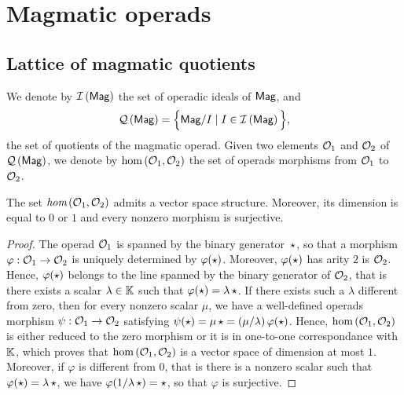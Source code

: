 
\section{Magmatic operads}


\subsection{Lattice of magmatic quotients}

We denote by $\mathcal{I}\left(\mathsf{Mag}\right)$ the set of operadic ideals of $\mathsf{Mag}$, and
\begin{equation} \label{equ:definition_of_QMag}
  \mathcal{Q}\left(\mathsf{Mag}\right) =\Big\{\mathsf{Mag}/ I\mid I\in\mathcal{I}\left(\mathsf{Mag}\right)\Big\},
  \end{equation}
the set of quotients of the magmatic operad. Given two elements $\mathcal{O}_1$
and $\mathcal{O}_2$ of $\mathcal{Q}\left(\mathsf{Mag}\right)$, we denote by $\text{hom}\left(\mathcal{O}_1,\mathcal{O}_2\right)$
the set of operads morphisms from $\mathcal{O}_1$ to $\mathcal{O}_2$.

\begin{Proposition} \label{prop:endomorphisms_of_magmatic_operads}
  The set $\emph{hom}\left(\mathcal{O}_1,\mathcal{O}_2\right)$ admits a vector space
  structure. Moreover, its dimension is equal to $0$ or $1$ and every
  nonzero morphism is surjective.
\end{Proposition}

\begin{proof}
  The operad $\mathcal{O}_1$ is spanned by the binary generator~$\operatorname{\star}$, so
  that a morphism $\varphi:\mathcal{O}_1\to\mathcal{O}_2$ is uniquely determined by
  $\varphi(\operatorname{\star})$. Moreover, $\varphi(\operatorname{\star})$ has arity $2$ is
  $\mathcal{O}_2$. Hence, $\varphi(\operatorname{\star})$ belongs to the line spanned by
  the binary generator of $\mathcal{O}_2$, that is there exists a scalar
  $\lambda\in\mathbb{K}$ such that $\varphi(\operatorname{\star})=\lambda\operatorname{\star}$. If there
  exists such a $\lambda$ different from zero, then for every nonzero
  scalar $\mu$, we have a well-defined operads morphism
  $\psi:\mathcal{O}_1\to\mathcal{O}_2$ satisfying $\psi(\operatorname{\star})=\mu\operatorname{\star}=\left(
  \mu/\lambda\right)\varphi(\operatorname{\star})$. Hence,
  $\text{hom}\left(\mathcal{O}_1,\mathcal{O}_2\right)$ is either reduced to the zero
  morphism or it is in one-to-one correspondance with $\mathbb{K}$, which
  proves that $\text{hom}\left(\mathcal{O}_1,\mathcal{O}_2\right)$ is a vector space
  of dimension at most $1$. Moreover, if $\varphi$ is different from $0$,
  that is there is a nonzero scalar such that
  $\varphi(\operatorname{\star})=\lambda\operatorname{\star}$, we have
  $\varphi(1/\lambda\operatorname{\star})=\operatorname{\star}$, so that $\varphi$ is
  surjective.
\end{proof}

